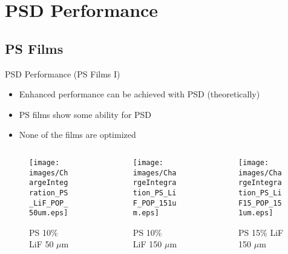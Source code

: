 
% 
%
\section{PSD Performance}

\subsection*{PS Films}
\begin{frame}{PSD Performance (PS Films I)}
\small
\begin{itemize}
	\item Enhanced performance can be achieved with PSD (theoretically)
	\item PS films show some ability for PSD
	\item None of the films are optimized \cite{zaitseva_plastic_2012}
\end{itemize}
\begin{columns}[onlytextwidth]
\begin{column}{0.30\textwidth}
	\tiny
	\begin{figure}
		\centering
		\texttt{[image: images/ChargeIntegration\_PS\_LiF\_POP\_50um.eps]}
		\caption{PS 10\% LiF 50 $\mu$m}
	\end{figure}
\end{column}
\begin{column}{0.30\textwidth}
	\tiny
	\begin{figure}
		\centering
		\texttt{[image: images/ChargeIntegration\_PS\_LiF\_POP\_151um.eps]}
		\caption{PS 10\% LiF 150 $\mu$m}
	\end{figure}
\end{column}
\begin{column}{0.30\textwidth}
	\tiny
	\begin{figure}
		\centering
		\texttt{[image: images/ChargeIntegration\_PS\_LiF15\_POP\_151um.eps]}
		\caption{PS 15\% LiF 150 $\mu$m}
	\end{figure}
\end{column}
\end{columns}
\end{frame}
